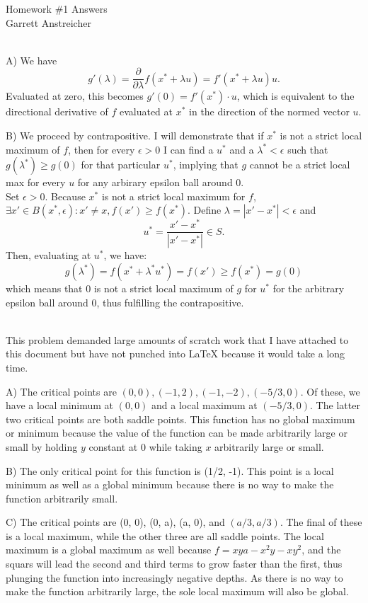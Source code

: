 \documentclass[12pt,leqno]{article}
\begin{document}
\begin{center}
\Large{Homework {\#}1 Answers}\\
\large{Garrett Anstreicher}
\end{center}

\bigskip
{}\\
\indent A) We have
$$g'(\lambda) = \frac{\partial}{\partial \lambda} f(x^* + \lambda u) = f'(x^* + \lambda u) u.$$
Evaluated at zero, this becomes $g'(0) = f'(x^*)\cdot u$, which is equivalent to the directional derivative of $f$ evaluated at $x^*$ in the direction of the normed vector $u$.

\bigskip
\indent B) We proceed by contrapositive. I will demonstrate that if $x^*$ is not a strict local maximum of $f$, then for every $\epsilon>0$ I can find a $u^*$ and a $\lambda^*<\epsilon$ such that $g(\lambda^*)\geq g(0)$ for that particular $u^*$, implying that $g$ cannot be a strict local max for every $u$ for any arbirary epsilon ball around 0.\\ 
	\indent Set $\epsilon>0$. Because $x^*$ is not a strict local maximum for $f$, $\exists x' \in B(x^*, \epsilon): x' \neq x, f(x')\geq f(x^*)$.  Define $\lambda = |x'-x^*|<\epsilon$ and 
$$u^* = \frac{x'-x^*}{|x'-x^*|} \in S.$$
Then, evaluating at $u^*$, we have:
$$g(\lambda^*) = f(x^* + \lambda^* u^*) = f(x') \geq f(x^*) = g(0)$$
which means that 0 is not a strict local maximum of $g$ for $u^*$ for the arbitrary epsilon ball around 0, thus fulfilling the contrapositive.

\bigskip
{}\\
\indent This problem demanded large amounts of scratch work that I have attached to this document but have not punched into LaTeX because it would take a long time.

\indent A) The critical points are $(0, 0), (-1, 2), (-1, -2), (-5/3, 0).$ Of these, we have a local minimum at $(0, 0)$ and a local maximum at $(-5/3, 0)$. The latter two critical points are both saddle points. This function has no global maximum or minimum because the value of the function can be made arbitrarily large or small by holding $y$ constant at 0 while taking $x$ arbitrarily large or small. 

\indent B) The only critical point for this function is (1/2, -1). This point is a local minimum as well as a global minimum because there is no way to make the function arbitrarily small. 

\indent C) The critical points are (0, 0), (0, a), (a, 0), and $(a/3, a/3).$ The final of these is a local maximum, while the other three are all saddle points. The local maximum is a global maximum as well because $f = xya - x^2y - xy^2$, and the squars will lead the second and third terms to grow faster than the first, thus plunging the function into increasingly negative depths. As there is no way to make the function arbitrarily large, the sole local maximum will also be global. 
\end{document}
